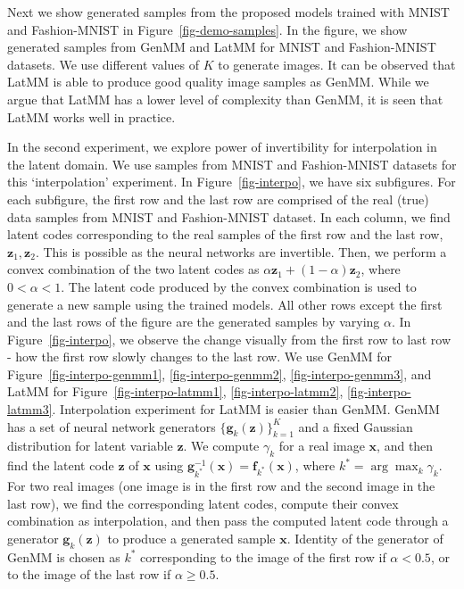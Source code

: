 Next we show generated samples from the proposed models trained with MNIST and Fashion-MNIST in Figure~\ref{fig-demo-samples}. In the figure, we show generated samples from GenMM and LatMM for MNIST and Fashion-MNIST datasets. We use different values of $K$ to generate images. It can be observed that LatMM is able to produce good quality image samples as GenMM. While we argue that LatMM has a lower level of complexity than GenMM, it is seen that LatMM works well in practice.    

In the second experiment, we explore power of invertibility for interpolation in the latent domain. We use samples from MNIST and Fashion-MNIST datasets for this `interpolation' experiment. In Figure~\ref{fig-interpo}, we have six subfigures. For each subfigure, the first row and the last row are comprised of the real (true) data samples from MNIST and Fashion-MNIST dataset. In each column, we find latent codes corresponding to the real samples of the first row and the last row, $\bm{z}_1, \bm{z}_2$. This is possible as the neural networks are invertible. Then, we perform a convex combination of the two latent codes as $\alpha \bm{z}_1 + (1- \alpha)\bm{z}_2$, where $0 < \alpha <1$. The latent code produced by the convex combination is used to generate a new sample using the trained models. All other rows except the first and the last rows of the figure are the generated samples by varying $\alpha$. In Figure~\ref{fig-interpo}, we observe the change visually from the first row to last row - how the first row slowly changes to the last row. We use GenMM for Figure~\ref{fig-interpo-genmm1}, \ref{fig-interpo-genmm2}, \ref{fig-interpo-genmm3}, and LatMM for Figure~\ref{fig-interpo-latmm1}, \ref{fig-interpo-latmm2}, \ref{fig-interpo-latmm3}. Interpolation experiment for LatMM is easier than GenMM. GenMM has a set of neural network generators $\{ \bm{g}_k(\bm{z}) \}_{k=1}^K$ and a fixed Gaussian distribution for latent variable $\bm{z}$. We compute $\gamma_k$ for a real image $\bm{x}$, and then find the latent code $\bm{z}$ of $\bm{x}$ using $\bm{g}_{k^{*}}^{-1}(\bm{x})=\bm{f}_{k^{*}}(\bm{x})$, where $k^{*} = \arg \max_{k} \gamma_k$. For two real images (one image is in the first row and the second image in the last row), we find the corresponding latent codes, compute their convex combination as interpolation, and then pass the computed latent code through a generator $\bm{g}_k(\bm{z})$ to produce a generated sample $\bm{x}$. Identity of the generator of GenMM is chosen as $k^{*}$ corresponding to the image of the first row if $\alpha < 0.5$, or to the image of the last row if $\alpha \geq 0.5$.

